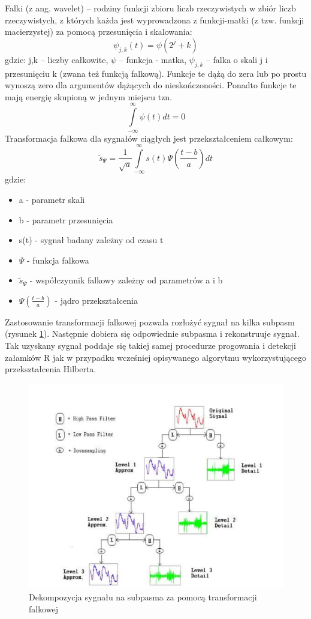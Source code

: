 Falki (z ang. wavelet) – rodziny funkcji zbioru liczb rzeczywistych w zbiór liczb rzeczywistych, z których każda jest wyprowadzona z funkcji-matki (z tzw. funkcji macierzystej) za pomocą przesunięcia i skalowania:
\begin{equation}
\psi_{j,k}(t)=\psi(2^j +k)
\end{equation}
gdzie: j,k – liczby całkowite, $\psi$ – funkcja - matka, $\psi_{j,k}$ – falka o skali j i przesunięciu k (zwana też funkcją falkową). Funkcje te dążą do zera lub po prostu wynoszą zero dla argumentów dążących do nieskończoności. Ponadto funkcje te mają energię skupioną w jednym miejscu tzn.
\begin{equation}
\int\limits_{-\infty}^{\infty} \psi(t)dt=0
\end{equation}
Transformacja falkowa dla sygnałów ciągłych jest przekształceniem całkowym:
\begin{equation}
\tilde{s}_{\Psi}=\frac{1}{\sqrt{a}}\int\limits_{-\infty}^{\infty}s(t)\Psi(\frac{t-b}{a})dt
\end{equation}
gdzie:
\begin{itemize}
\item a - parametr skali
\item b - parametr przesunięcia
\item s(t) - sygnał badany zależny od czasu t
\item $\Psi$ - funkcja falkowa
\item $\tilde{s} _\Psi$ - współczynnik falkowy zależny od parametrów a i b
\item $\Psi(\frac{t-b}{a})$ - jądro przekształcenia
\end{itemize}
Zastosowanie transformacji falkowej pozwala rozłożyć sygnał na kilka subpasm (rysunek \ref{fig:RPWS}). Następnie dobiera się odpowiednie subpasma i rekonstruuje sygnał. Tak uzyskany sygnał poddaje się takiej samej procedurze progowania i detekcji załamków R jak w przypadku wcześniej opisywanego algorytmu wykorzystującego przekształcenia Hilberta.
\begin{figure}[H]
\centering
\includegraphics[scale=0.6]{R_PEAKS/img/wavelet_schema}
\caption{Dekompozycja sygnału na subpasma za pomocą transformacji falkowej}
\label{fig:RPWS}
\end{figure}

